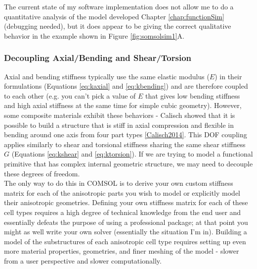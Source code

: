 {%

The current state of my software implementation does not allow me to do a quantitative analysis of the model developed Chapter \ref{chap:functionSim} (debugging needed), but it does appear to be giving the correct qualitative behavior in the example shown in Figure \ref{fig:somsolsim1}A.

\subsubsection{Decoupling Axial/Bending and Shear/Torsion}\label{sec:decoupling}

Axial and bending stiffness typically use the same elastic modulus ($E$) in their formulations (Equations \ref{eq:kaxial} and \ref{eq:kbending}) and are therefore coupled to each other (e.g. you can't pick a value of $E$ that gives low bending stiffness and high axial stiffness at the same time for simple cubic geometry).  However, some composite materials exhibit these behaviors - Calisch showed that it is possible to build a structure that is stiff in axial compression and flexible in bending around one axis from four part types \ref{Calisch2014}.  This DOF coupling applies similarly to shear and torsional stiffness sharing the same shear stiffness $G$ (Equations \ref{eq:kshear} and \ref{eq:ktorsion}).  If we are trying to model a functional primitive that has complex internal geometric structure, we may need to decouple these degrees of freedom.\\

The only way to do this in COMSOL is to derive your own custom stiffness matrix for each of the anisotropic parts you wish to model or explicitly model their anisotropic geometries.  Defining your own stiffness matrix for each of these cell types requires a high degree of technical knowledge from the end user and essentially defeats the purpose of using a professional package; at that point you might as well write your own solver (essentially the situation I'm in).  Building a model of the substructures of each anisotropic cell type requires setting up even more material properties, geometries, and finer meshing of the model - slower from a user perspective and slower computationally.

}
